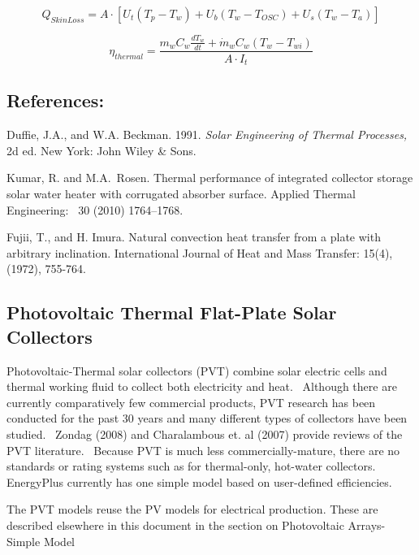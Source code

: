 \begin{equation}
{Q_{SkinLoss}} = A \cdot \left[ {{U_t}\left( {{T_p} - {T_w}} \right) + {U_b}\left( {{T_w} - {T_{OSC}}} \right) + {U_s}\left( {{T_w} - {T_a}} \right)} \right]
\end{equation}

\begin{equation}
{\eta_{thermal}} = \frac{{{m_w}{C_w}\frac{{d{T_w}}}{{dt}} + {{\dot m}_w}{C_w}\left( {{T_w} - {T_{wi}}} \right)}}{{A \cdot {I_t}}}
\end{equation}

\subsection{References:}\label{references-1-016}

Duffie, J.A., and W.A. Beckman. 1991. \emph{Solar Engineering of Thermal Processes,} 2d ed. New York: John Wiley \& Sons.

Kumar, R. and M.A.~Rosen. Thermal performance of integrated collector storage solar water heater with corrugated absorber surface. Applied Thermal Engineering:~ 30 (2010) 1764--1768.

Fujii, T., and H. Imura. Natural convection heat transfer from a plate with arbitrary inclination. International Journal of Heat and Mass Transfer: 15(4), (1972), 755-764.

\subsection{Photovoltaic Thermal Flat-Plate Solar Collectors}\label{photovoltaic-thermal-flat-plate-solar-collectors}

Photovoltaic-Thermal solar collectors (PVT) combine solar electric cells and thermal working fluid to collect both electricity and heat.~ Although there are currently comparatively few commercial products, PVT research has been conducted for the past 30 years and many different types of collectors have been studied.~ Zondag (2008) and Charalambous et. al (2007) provide reviews of the PVT literature.~ Because PVT is much less commercially-mature, there are no standards or rating systems such as for thermal-only, hot-water collectors.~ EnergyPlus currently has one simple model based on user-defined efficiencies.

The PVT models reuse the PV models for electrical production. These are described elsewhere in this document in the section on Photovoltaic Arrays-Simple Model


